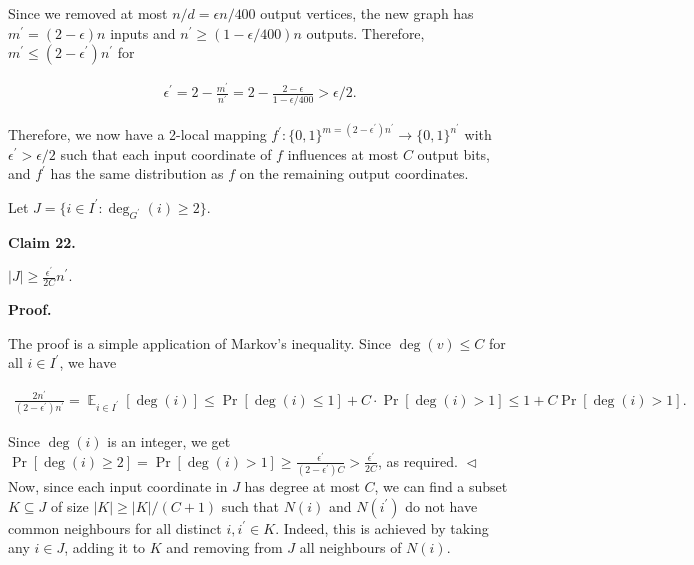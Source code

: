 \documentclass[10pt,a4paper]{article}
\begin{document}
Since we removed at most $n/d=\epsilon n/400$ output vertices, the new graph has $m^{\prime}=(2-\epsilon)n$ inputs and $n^{\prime}\geq(1-\epsilon/400)n$ outputs. Therefore,
$m^{\prime}\leq(2-\epsilon^{\prime})n^{\prime}$ for\par


\[\begin{gathered}
\epsilon^{\prime}=2-\frac{m^{\prime}}{n^{\prime}}=2-\frac{2-\epsilon}{1-\epsilon/400}>\epsilon/2.
\end{gathered}\]




Therefore, we now have a 2-local mapping $f^{\prime}\colon\{0,1\}^{m=(2-\epsilon^{\prime})n^{\prime}}\to\{0,1\}^{n^{\prime}}$ with $\epsilon^{\prime}>\epsilon/2$ such that each input coordinate of $f$ influences at most $C$ output bits, and $f^{\prime}$ has the same distribution as $f$ on the remaining output coordinates.\par




Let $J=\{i\in I^{\prime}:\deg_{G^{\prime}}(i)\geq 2\}$.\par





\par\medskip\noindent\textbf{
Claim 22. 
}\par



$\lvert J\rvert\geq\frac{\epsilon^{\prime}}{2C}n^{\prime}$.\par







\par\medskip\noindent\textbf{
\textbf{Proof}.}\par




The proof is a simple application of Markov’s inequality.
Since $\deg(v)\leq C$ for all $i\in I^{\prime}$, we have\par


\[\begin{gathered}
\frac{2n^{\prime}}{(2-\epsilon^{\prime})n^{\prime}}=\operatorname{\mathbb{E}}_{i\in I^{\prime}}[\deg(i)]\leq\Pr[\deg(i)\leq 1]+C\cdot\Pr[\deg(i)>1]\leq 1+C\Pr[\deg(i)>1].
\end{gathered}\]


Since $\deg(i)$ is an integer, we get
$\Pr[\deg(i)\geq 2]=\Pr[\deg(i)>1]\geq\frac{\epsilon^{\prime}}{(2-\epsilon^{\prime})C}>\frac{\epsilon^{\prime}}{2C}$,
as required.
$\vartriangleleft$
Now, since each input coordinate in $J$ has degree at most $C$, we can find a subset $K\subseteq J$ of size $\lvert K\rvert\geq\lvert K\rvert/(C+1)$ such that $N(i)$ and $N(i^{\prime})$ do not have common neighbours for all distinct $i,i^{\prime}\in K$. Indeed, this is achieved by taking any $i\in J$, adding it to $K$ and removing from $J$ all neighbours of $N(i)$.\par
\end{document}
